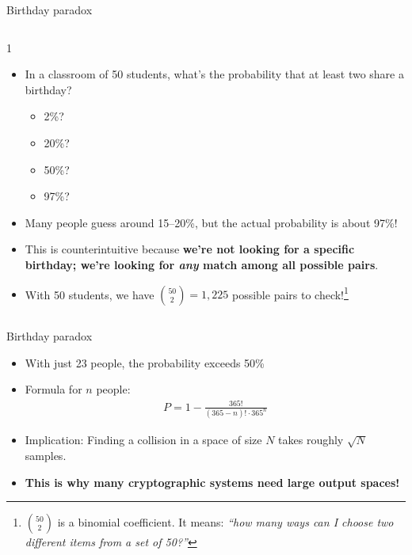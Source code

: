 \ifdefined\PRESENTATION\else\PassOptionsToClass{handout}{beamer}\fi\documentclass[aspectratio=169, lualatex]{beamer}
\begin{document}
\begin{frame}{Birthday paradox}
	\begin{columns}[c]
		\begin{column}{1\textwidth}
			\begin{itemize}
				\item In a classroom of 50 students, what's the probability that at least two share a birthday?
				      \begin{itemize}
					      \item 2\%?
					      \item 20\%?
					      \item 50\%?
					      \item 97\%?
				      \end{itemize}
				\item Many people guess around 15--20\%, but the actual probability is about 97\%!
				\item This is counterintuitive because \textbf{we're not looking for a specific birthday; we're looking for \textit{any} match among all possible pairs}.
				\item With 50 students, we have $\binom{50}{2} = 1{,}225$ possible pairs to check!\footnote{$\binom{50}{2}$ is a binomial coefficient. It means: \textit{``how many ways can I choose two different items from a set of 50?''}}
			\end{itemize}
		\end{column}
	\end{columns}
\end{frame}

\begin{frame}{Birthday paradox}
	\begin{itemize}
		\item With just 23 people, the probability exceeds 50\%
		\item Formula for $n$ people:
		      \begin{align*}
			      P = 1 - \frac{365!}{(365-n)! \cdot 365^n}
		      \end{align*}
		\item Implication: Finding a collision in a space of size $N$ takes roughly $\sqrt{N}$ samples.
		\item \textbf{This is why many cryptographic systems need large output spaces!}
	\end{itemize}
\end{frame}
\end{document}
